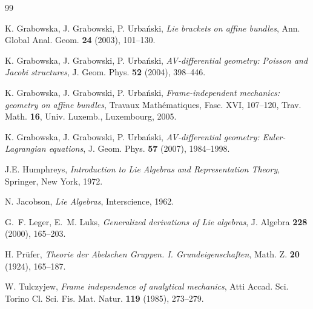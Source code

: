\documentclass{article}
\theoremstyle{definition}
\theoremstyle{remark}
\theoremstyle{plain}
\begin{document}
\begin{thebibliography}{99}

K. Grabowska, J. Grabowski, P. Urba\'nski,
\textit{Lie brackets on affine bundles},
Ann. Global Anal. Geom. \textbf{24} (2003), 101--130.

K. Grabowska, J. Grabowski, P. Urba\'nski,
\textit{AV-differential geometry: Poisson and Jacobi structures},
J. Geom. Phys. \textbf{52} (2004), 398--446.

K. Grabowska, J. Grabowski, P. Urba\'nski,
\textit{Frame-independent mechanics: geometry on affine bundles},
Travaux Math\'ematiques, Fasc. XVI, 107--120,
Trav. Math. \textbf{16}, Univ. Luxemb., Luxembourg, 2005.

K. Grabowska, J. Grabowski, P. Urba\'nski,
\textit{AV-differential geometry: Euler-Lagrangian equations},
J. Geom. Phys. \textbf{57} (2007), 1984--1998.

J.E. Humphreys, \textit{Introduction to Lie Algebras and Representation Theory}, Springer, New York, 1972.

N. Jacobson,
\textit{Lie Algebras},
Interscience, 1962.

G.~F. Leger, E.~M. Luks,
\textit{Generalized derivations of Lie algebras},
J. Algebra \textbf{228} (2000), 165--203.



H. Pr\"ufer,
\textit{Theorie der Abelschen Gruppen. I. Grundeigenschaften},
Math. Z. \textbf{20} (1924), 165--187.


W. Tulczyjew,
\textit{Frame independence of analytical mechanics},
Atti Accad. Sci. Torino Cl. Sci. Fis. Mat. Natur.
\textbf{119} (1985), 273--279.

\end{thebibliography}
\end{document}
